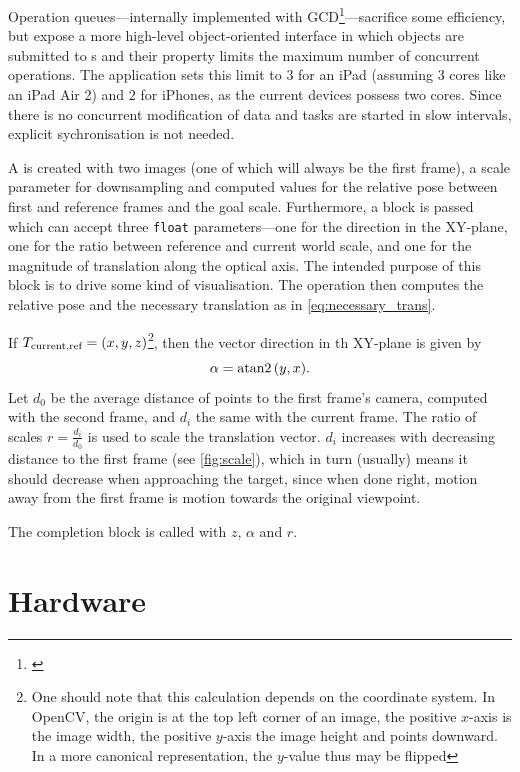 Operation queues---internally implemented with
GCD\footnote{\citep{nsopgcd}}---sacrifice some efficiency, but expose a more
high-level object-oriented interface in which  objects are
submitted to s and their
 property limits the maximum number of
concurrent operations. The application sets this limit to $3$ for an iPad
(assuming $3$ cores like an iPad Air 2) and $2$ for iPhones, as the current
devices possess two cores. Since there is no concurrent modification of data and
tasks are started in slow intervals, explicit sychronisation is not needed.
 
A  is created with two images (one of
which will always be the first frame), a scale parameter for downsampling and
computed values for the relative pose between first and reference frames and the
goal scale. Furthermore, a block is passed which can accept three \texttt{float}
parameters---one for the direction in the XY-plane, one for the ratio between
reference and current world scale, and one for the magnitude of translation along
the optical axis. The intended purpose of this block is to drive some kind of
visualisation. The operation then computes the relative pose and the necessary
translation as in \eqref{eq:necessary_trans}. 

If $T_{\text{current,ref}} = (x,y,z)$\footnote{One should note that this
   calculation depends on the coordinate system. In OpenCV, the origin is at the
   top left corner of an image, the positive $x$-axis is the image width, the
   positive $y$-axis the image height and points downward. In a more canonical
representation, the $y$-value thus may be flipped}, then the vector direction
in th XY-plane is given by 
\begin{equation*}
   \alpha = \atan2{(y,x)}.
\end{equation*}
Let $d_0$ be the average distance of points to the first frame's camera,
computed with the second frame, and $d_i$ the same with the current frame. The
ratio of scales $r=\frac{d_i}{d_0}$ is used to scale the translation vector. $d_i$
increases with decreasing distance to the first frame (see \autoref{fig:scale}),
which in turn (usually) means it should decrease when approaching the target,
since when done right, motion away from the first frame is motion towards the
original viewpoint.

The completion block is called with $z$, $\alpha$ and $r$.

\section{Hardware}

